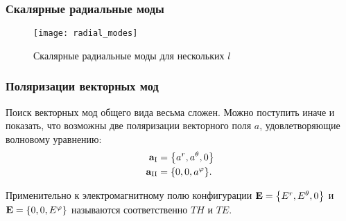 \documentclass{beamer}
\begin{document}

    \begin{frame}\frametitle{Скалярные радиальные моды}

        \begin{figure}[h]
            \centering
            \texttt{[image: radial\_modes]}
            \caption[]{Скалярные радиальные моды для нескольких $l$}
            \label{fig:radial_modes}
        \end{figure}

    \end{frame}


    \begin{frame}\frametitle{Поляризации векторных мод}

        Поиск векторных мод общего вида весьма сложен. Можно поступить иначе и показать, что возможны две поляризации векторного поля $a$, удовлетворяющие волновому уравнению:
        \begin{equation}\begin{aligned}
            \vb{a}_{\mathrm{I}} &= \qty{ a^r, a^\theta, 0 } \\
            \vb{a}_{\mathrm{II}} &= \qty{ 0, 0, a^\varphi } .
        \end{aligned}\end{equation}

        Применительно к электромагнитному полю конфигурации $\vb{E} = \qty{ E^r, E^\theta, 0 }$ и $\vb{E} = \qty{ 0, 0, E^\varphi }$ называются соответственно $TH$ и $TE$.

    \end{frame}

\end{document}
